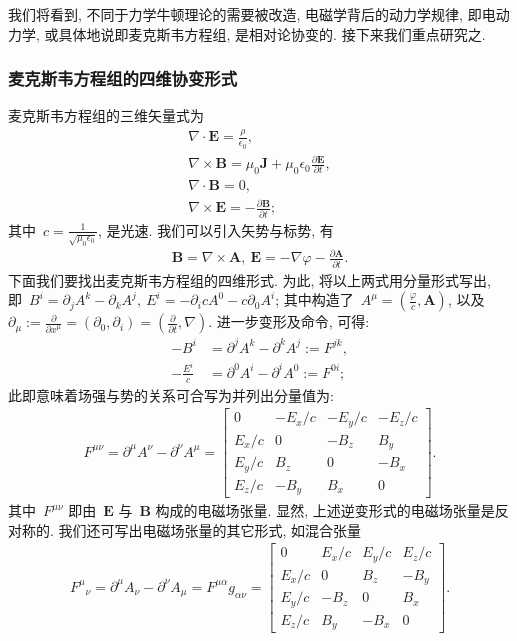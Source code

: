 我们将看到, 不同于力学牛顿理论的需要被改造, 电磁学背后的动力学规律, 即电动力学, 或具体地说即麦克斯韦方程组, 是相对论协变的. 接下来我们重点研究之.

\subsubsection{麦克斯韦方程组的四维协变形式}
麦克斯韦方程组的三维矢量式为
\begin{gather}
\nabla\cdot\bm{E}=\frac{\rho}{\epsilon_0},\\
\nabla\times\bm{B}=\mu_0\bm{J}+\mu_0\epsilon_0\frac{\partial\bm{E}}{\partial t},\\
\nabla\cdot\bm{B}=0,\\
\nabla\times\bm{E}=-\frac{\partial\bm{B}}{\partial t};
\end{gather}
其中~$c=\frac{1}{\sqrt{\mu_0\epsilon_0}}$, 是光速. 我们可以引入矢势与标势, 有
\begin{gather}
\bm{B}=\nabla\times\bm{A},~\bm{E}=-\nabla\varphi-\frac{\partial\bm{A}}{\partial t}.
\end{gather}
下面我们要找出麦克斯韦方程组的四维形式. 为此, 将以上两式用分量形式写出, 即~$B^i=\partial_jA^k-\partial_kA^j,~E^i=-\partial_icA^0-c\partial_0A^i$; 其中构造了~$A^\mu=(\frac{\varphi}{c},\bm{A})$, 以及~$\partial_\mu:=\frac{\partial}{\partial x^\mu}=(\partial_0,\partial_i)=(\frac{\partial}{\partial t},\nabla)$. 进一步变形及命令, 可得:
\begin{align}
-B^i&=\partial^jA^k-\partial^kA^j:= F^{jk},\\
-\frac{E^i}{c}&=\partial^0A^i-\partial^iA^0:= F^{0i};
\end{align}
此即意味着场强与势的关系可合写为并列出分量值为:
\begin{align}
F^{\mu\nu}=\partial^\mu A^\nu-\partial^\nu A^\mu=
\left[
\begin{array}{cccc}
0&-E_x/c&-E_y/c&-E_z/c\\
E_x/c&0&-B_z&B_y\\
E_y/c&B_z&0&-B_x\\
E_z/c&-B_y&B_x&0
\end{array}
\right].
\end{align}
其中~$F^{\mu\nu}$ 即由~$\bm{E}$ 与~$\bm{B}$ 构成的电磁场张量. 显然, 上述逆变形式的电磁场张量是反对称的. 我们还可写出电磁场张量的其它形式, 如混合张量
\begin{align}
{F^\mu}_\nu=\partial^\mu A_\nu-\partial^\nu A_\mu=F^{\mu\alpha}g_{\alpha\nu}=
\left[
\begin{array}{cccc}
0&E_x/c&E_y/c&E_z/c\\
E_x/c&0&B_z&-B_y\\
E_y/c&-B_z&0&B_x\\
E_z/c&B_y&-B_x&0
\end{array}
\right].
\end{align}
